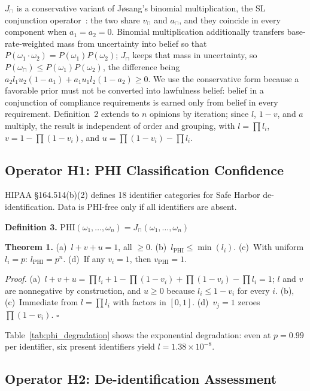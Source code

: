 \documentclass[conference]{IEEEtran}
\begin{document}
$J_\sqcap$ is a conservative variant of J{\o}sang's binomial multiplication, the SL conjunction operator~\cite{josang2016subjective}: the two share $v_\sqcap$ and $a_\sqcap$, and they coincide in every component when $a_1 = a_2 = 0$. Binomial multiplication additionally transfers base-rate-weighted mass from uncertainty into belief so that $P(\omega_1 \cdot \omega_2) = P(\omega_1) P(\omega_2)$; $J_\sqcap$ keeps that mass in uncertainty, so $P(\omega_\sqcap) \leq P(\omega_1) P(\omega_2)$, the difference being $a_2 l_1 u_2 (1 - a_1) + a_1 u_1 l_2 (1 - a_2) \geq 0$. We use the conservative form because a favorable prior must not be converted into lawfulness belief: belief in a conjunction of compliance requirements is earned only from belief in every requirement. Definition~2 extends to $n$ opinions by iteration; since $l$, $1 - v$, and $a$ multiply, the result is independent of order and grouping, with $l = \prod l_i$, $v = 1 - \prod (1 - v_i)$, and $u = \prod (1 - v_i) - \prod l_i$.

\subsection{Operator H1: PHI Classification Confidence}

HIPAA \S164.514(b)(2) defines 18 identifier categories for Safe Harbor de-identification. Data is PHI-free only if all identifiers are absent.

\textbf{Definition 3.} $\text{PHI}(\omega_1, \ldots, \omega_n) = J_\sqcap(\omega_1, \ldots, \omega_n)$

\textbf{Theorem 1.} (a)~$l + v + u = 1$, all $\geq 0$. (b)~$l_{\text{PHI}} \leq \min(l_i)$. (c)~With uniform $l_i = p$: $l_{\text{PHI}} = p^n$. (d)~If any $v_i = 1$, then $v_{\text{PHI}} = 1$.

\emph{Proof.} (a)~$l + v + u = \prod l_i + 1 - \prod(1 - v_i) + \prod(1 - v_i) - \prod l_i = 1$; $l$ and $v$ are nonnegative by construction, and $u \geq 0$ because $l_i \leq 1 - v_i$ for every $i$. (b), (c)~Immediate from $l = \prod l_i$ with factors in $[0, 1]$. (d)~$v_j = 1$ zeroes $\prod(1 - v_i)$. $\square$

Table~\ref{tab:phi_degradation} shows the exponential degradation: even at $p = 0.99$ per identifier, six present identifiers yield $l = 1.38 \times 10^{-8}$.



\subsection{Operator H2: De-identification Assessment}
\end{document}
